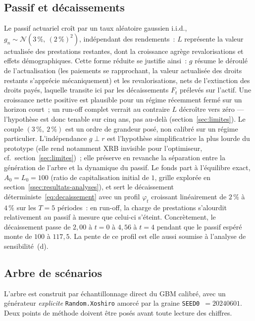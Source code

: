 \documentclass[11pt,letterpaper]{article}
\theoremstyle{definition}
\begin{document}
\subsection{Passif et décaissements}\label{ssec:passif}

Le passif actuariel croît par un taux aléatoire gaussien i.i.d.,
$g_n \sim \mathcal N(3\,\%,\ (2\,\%)^2)$, indépendant des rendements~: $L$
représente la valeur actualisée des prestations restantes, dont la croissance
agrège revalorisations et effets démographiques. Cette forme réduite se
justifie ainsi~: $g$ résume le déroulé de l'actualisation (les paiements se
rapprochant, la valeur actualisée des droits restants s'apprécie
mécaniquement) et les revalorisations, nets de l'extinction des droits payés,
laquelle transite ici par les décaissements $F_t$ prélevés sur l'actif. Une
croissance nette positive est plausible pour un régime récemment fermé sur un
horizon court~; un run-off complet verrait au contraire $L$ décroître vers
zéro --- l'hypothèse est donc tenable sur cinq ans, pas au-delà
(section~\ref{sec:limites}). Le couple $(3\,\%,\ 2\,\%)$ est un ordre de
grandeur posé, non calibré sur un régime particulier. L'indépendance $g \perp r$ est
l'hypothèse simplificatrice la plus lourde du prototype (elle rend notamment
XRB invisible pour l'optimiseur, cf.\ section~\ref{sec:limites})~; elle
préserve en revanche la séparation entre la génération de l'arbre et la
dynamique du passif. Le fonds part à l'équilibre exact, $A_0 = L_0 = 100$
(ratio de capitalisation initial de $1$, grille explorée en
section~\ref{ssec:resultats-analyses}), et sert le décaissement
déterministe~\eqref{eq:decaissement} avec un profil $\varphi_t$ croissant
linéairement de $2\,\%$ à $4\,\%$ sur les $T = 5$ périodes~: en run-off, la
charge de prestations s'alourdit relativement au passif à mesure que celui-ci
s'éteint. Concrètement, le décaissement passe de $2{,}00$ à $t=0$ à $4{,}56$ à
$t=4$ pendant que le passif espéré monte de $100$ à $117{,}5$. La pente de ce
profil est elle aussi soumise à l'analyse de sensibilité~(d).

\subsection{Arbre de scénarios}\label{ssec:arbre}

L'arbre est construit par échantillonnage direct du GBM calibré, avec un
générateur \emph{explicite} \texttt{Random.Xoshiro} amorcé par la graine
\texttt{SEED0}~$= 20240601$. Deux points de méthode doivent être posés avant
toute lecture des chiffres.
\end{document}
